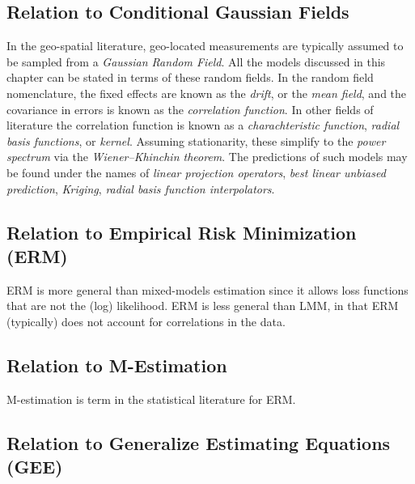 \documentclass[]{book}
\theoremstyle{definition}
\theoremstyle{definition}
\theoremstyle{definition}
\theoremstyle{remark}
\begin{document}
\hypertarget{relation-to-conditional-gaussian-fields}{%
\subsection{Relation to Conditional Gaussian Fields}\label{relation-to-conditional-gaussian-fields}}

In the geo-spatial literature, geo-located measurements are typically assumed to be sampled from a \emph{Gaussian Random Field}.
All the models discussed in this chapter can be stated in terms of these random fields.
In the random field nomenclature, the fixed effects are known as the \emph{drift}, or the \emph{mean field}, and the covariance in errors is known as the \emph{correlation function}.
In other fields of literature the correlation function is known as a \emph{charachteristic function}, \emph{radial basis functions}, or \emph{kernel}.
Assuming stationarity, these simplify to the \emph{power spectrum} via the \emph{Wiener--Khinchin theorem}.
The predictions of such models may be found under the names of \emph{linear projection operators}, \emph{best linear unbiased prediction}, \emph{Kriging}, \emph{radial basis function interpolators}.

\hypertarget{relation-to-empirical-risk-minimization-erm}{%
\subsection{Relation to Empirical Risk Minimization (ERM)}\label{relation-to-empirical-risk-minimization-erm}}

ERM is more general than mixed-models estimation since it allows loss functions that are not the (log) likelihood.
ERM is less general than LMM, in that ERM (typically) does not account for correlations in the data.

\hypertarget{relation-to-m-estimation}{%
\subsection{Relation to M-Estimation}\label{relation-to-m-estimation}}

M-estimation is term in the statistical literature for ERM.

\hypertarget{relation-to-generalize-estimating-equations-gee}{%
\subsection{Relation to Generalize Estimating Equations (GEE)}\label{relation-to-generalize-estimating-equations-gee}}
\end{document}
